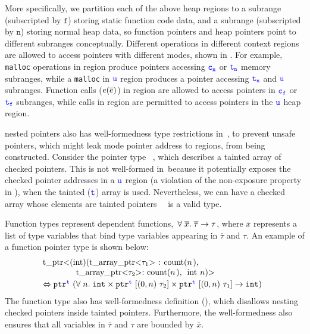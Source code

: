 More specifically, we partition each of the above heap regions to a subrange (subscripted by $\texttt{f}$) storing static function code data, and a subrange (subscripted by $\texttt{n}$) storing normal heap data,
so function pointers and heap pointers point to different subranges conceptually.
Different operations in different context regions are allowed to access pointers with different modes, shown in .
For example, \texttt{malloc} operations in \cmode region produce pointers accessing $\textcolor{blue}{\texttt{c}_{\texttt{n}}}$ or $\textcolor{blue}{\texttt{t}_{\texttt{n}}}$ memory subranges, while a \texttt{malloc} in $\textcolor{blue}{\texttt{u}}$ region produces a pointer accessing $\textcolor{blue}{\texttt{t}_{\texttt{n}}}$ and $\textcolor{blue}{\texttt{u}}$ subranges.
Function calls (${e}({\overline{e}})$) in \cmode region are allowed to access pointers in $\textcolor{blue}{\texttt{c}_{\texttt{f}}}$ or $\textcolor{blue}{\texttt{t}_{\texttt{f}}}$ subranges,
while calls in \umode region are permitted to access pointers in the $\textcolor{blue}{\texttt{u}}$ heap region.

\systemname nested pointers also has well-formedness type restrictions in~,
to prevent unsafe pointers, which might leak \cmode mode pointer address to \umode regions, from being constructed.
Consider the pointer type ~, which describes a tainted array of checked pointers.
This is not well-formed in~\lang because it potentially exposes the checked pointer addresses in a $\textcolor{blue}{\texttt{u}}$ region (a violation of the non-exposure property in ), when the tainted ($\textcolor{blue}{\texttt{t}}$) array is used. Nevertheless, we can have a checked array whose elements are tainted pointers\mzs{,}\mzr{:}~\eg~ is a valid type.

Function types represent dependent functions,~\ie $\forall \;\overline{x}.\;{\overline{\tau}}\to\tau$,
where $\overline{x}$ represents a list of \tint{} type variables that bind type variables appearing in $\overline{\tau}$ and $\tau$.
An example of a function pointer type is shown below:
{\small
\[\hspace*{-0.5em}
\begin{array}{l}
$\code{t_ptr<(int)(t_array_ptr<}$\tau_1$\code{> : count(}$n$\code{),}$\\
\qquad\qquad$\code{t_array_ptr<}$\tau_2$\code{>: count(}$n$\code{), int}$\;n$\code{)>}$
\\[0.2em]
\Leftrightarrow\; $\tptr{(\tfun{n}{\tint \times \tarrayptr{0}{n}{\tau_2}{\tmode} \times \tarrayptr{0}{n}{\tau_1}{\tmode}}{\tint})}{\tmode}$
\end{array}
\]
}
The function type also has well-formedness definition (), which disallows nesting checked pointers inside tainted pointers. Furthermore, the well-formedness also ensures that all variables in $\overline{\tau}$ and $\tau$ are bounded by $\overline{x}$.

